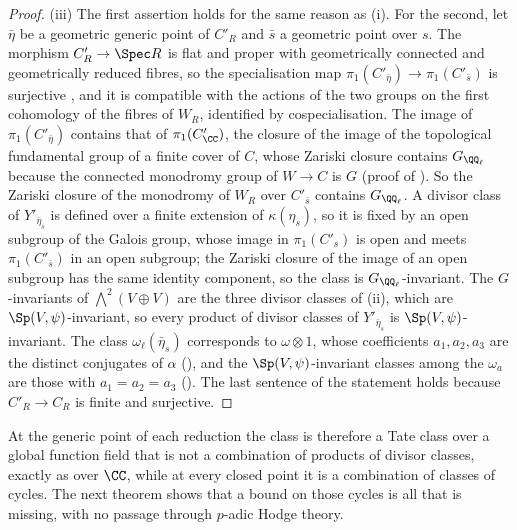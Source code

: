 \begin{proof}
(iii) The first assertion holds for the same reason as (i). For the second,
let $\bar\eta$ be a geometric generic point of $C'_{R}$ and $\bar{s}$ a
geometric point over $s$. The morphism $C'_{R}\to\Spec R$ is flat and proper
with geometrically connected and geometrically reduced fibres, so the
specialisation map $\pi_{1}(C'_{\bar\eta})\to\pi_{1}(C'_{\bar{s}})$ is
surjective \cite[Tag~0C0P]{Stacks}, and it is compatible with the actions of
the two groups on the first cohomology of the fibres of $W_{R}$, identified by
cospecialisation. The image of $\pi_{1}(C'_{\bar\eta})$ contains that of
$\pi_{1}(C'_{\CC})$, the closure of the image of the topological fundamental
group of a finite cover of $C$, whose Zariski closure contains
$G_{\QQ_{\ell}}$ because the connected monodromy group of $W\to C$ is $G$
(proof of ). So the Zariski closure of the
monodromy of $W_{R}$ over $C'_{\bar{s}}$ contains $G_{\QQ_{\ell}}$. A divisor
class of $Y'_{\bar\eta_{s}}$ is defined over a finite extension of
$\kappa(\eta_{s})$, so it is fixed by an open subgroup of the Galois group,
whose image in $\pi_{1}(C'_{s})$ is open \cite[Tag~0BQI]{Stacks} and meets
$\pi_{1}(C'_{\bar{s}})$ in an open subgroup; the Zariski closure of the image
of an open subgroup has the same identity component, so the class is
$G_{\QQ_{\ell}}$-invariant. The $G$-invariants of ${\textstyle\bigwedge^{2}}(V\oplus V)$ are the
three divisor classes of (ii), which are
$\Sp(V,\psi)$-invariant, so every product of divisor classes of
$Y'_{\bar\eta_{s}}$ is $\Sp(V,\psi)$-invariant. The class
$\omega_{\ell}(\bar\eta_{s})$ corresponds to $\omega\otimes1$, whose
coefficients $a_{1},a_{2},a_{3}$ are the distinct conjugates of $\alpha$
(), and the $\Sp(V,\psi)$-invariant classes among the
$\omega_{a}$ are those with $a_{1}=a_{2}=a_{3}$ ().
The last sentence of the statement holds because $C'_{R}\to C_{R}$ is finite
and surjective.
\end{proof}

At the generic point of each reduction the class is therefore a Tate class
over a global function field that is not a combination of products of divisor
classes, exactly as over $\CC$, while at every closed point it is a
combination of classes of cycles. The next theorem shows that a bound on those
cycles is all that is missing, with no passage through $p$-adic Hodge theory.

